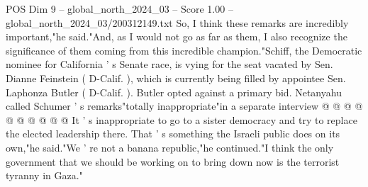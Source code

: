 \begin{textsample}{POS Dim 9 – global\_north\_2024\_03 – Score 1.00 – global\_north\_2024\_03/200312149.txt}
So, I think these remarks are incredibly important,"he said."And, as I would not go as far as them, I also recognize the significance of them coming from this incredible champion."Schiff, the Democratic nominee for California ' s Senate race, is vying for the seat vacated by Sen.
Dianne Feinstein ( D-Calif. ), which is currently being filled by appointee Sen.
Laphonza Butler ( D-Calif. ).
Butler opted against a primary bid.
Netanyahu called Schumer ' s remarks"totally inappropriate"in a separate interview @ @ @ @ @ @ @ @ @ @ It ' s inappropriate to go to a sister democracy and try to replace the elected leadership there.
That ' s something the Israeli public does on its own,"he said."We ' re not a banana republic,"he continued."I think the only government that we should be working on to bring down now is the terrorist tyranny in Gaza."

\end{textsample}
